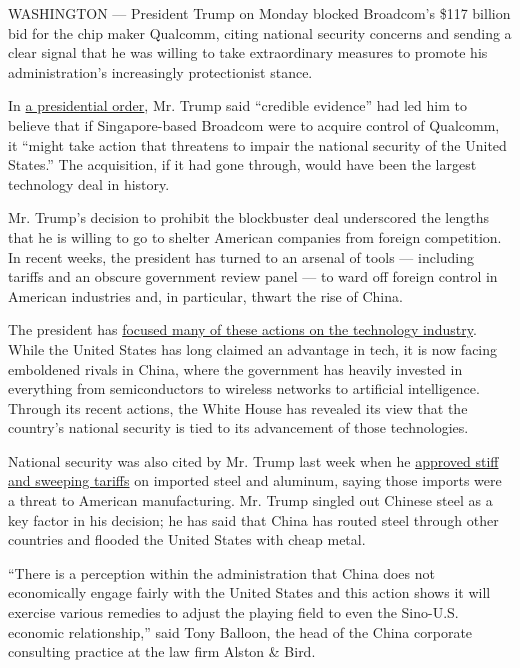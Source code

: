 WASHINGTON --- President Trump on Monday blocked Broadcom's \$117
billion bid for the chip maker Qualcomm, citing national security
concerns and sending a clear signal that he was willing to take
extraordinary measures to promote his administration's increasingly
protectionist stance.

In
\href{https://www.whitehouse.gov/presidential-actions/presidential-order-regarding-proposed-takeover-qualcomm-incorporated-broadcom-limited/}{a
presidential order}, Mr. Trump said ``credible evidence'' had led him to
believe that if Singapore-based Broadcom were to acquire control of
Qualcomm, it ``might take action that threatens to impair the national
security of the United States.'' The acquisition, if it had gone
through, would have been the largest technology deal in history.

Mr. Trump's decision to prohibit the blockbuster deal underscored the
lengths that he is willing to go to shelter American companies from
foreign competition. In recent weeks, the president has turned to an
arsenal of tools --- including tariffs and an obscure government review
panel --- to ward off foreign control in American industries and, in
particular, thwart the rise of China.

The president has
\href{https://www.nytimes.com/2018/03/06/business/us-china-trade-technology-deals.html}{focused
many of these actions on the technology industry}. While the United
States has long claimed an advantage in tech, it is now facing
emboldened rivals in China, where the government has heavily invested in
everything from semiconductors to wireless networks to artificial
intelligence. Through its recent actions, the White House has revealed
its view that the country's national security is tied to its advancement
of those technologies.

National security was also cited by Mr. Trump last week when he
\href{https://www.nytimes.com/2018/03/08/us/politics/trump-tariff-announcement.html}{approved
stiff and sweeping tariffs} on imported steel and aluminum, saying those
imports were a threat to American manufacturing. Mr. Trump singled out
Chinese steel as a key factor in his decision; he has said that China
has routed steel through other countries and flooded the United States
with cheap metal.

``There is a perception within the administration that China does not
economically engage fairly with the United States and this action shows
it will exercise various remedies to adjust the playing field to even
the Sino-U.S. economic relationship,'' said Tony Balloon, the head of
the China corporate consulting practice at the law firm Alston \& Bird.

